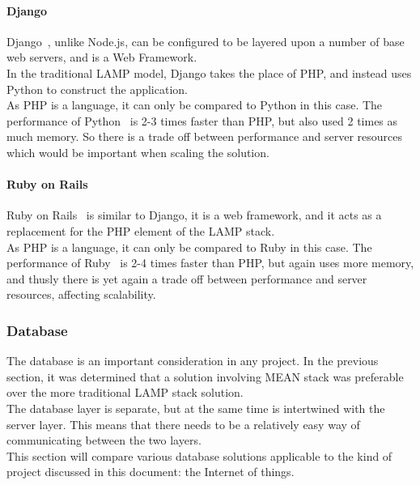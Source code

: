 \documentclass[draft,preprint,12pt,3p]{elsarticle}
\begin{document}
\paragraph{Django}
Django~\cite{django}, unlike Node.js, can be configured to be layered upon a number of base web servers, and is a Web Framework.\\
In the traditional LAMP model, Django takes the place of PHP, and instead uses Python to construct the application.\\
As PHP is a language, it can only be compared to Python in this case. The performance of Python~\cite{djangovsphp} is 2-3 times faster than PHP, but also used 2 times as much memory. So there is a trade off between performance and server resources which would be important when scaling the solution.

\paragraph{Ruby on Rails}
Ruby on Rails~\cite{ruby} is similar to Django, it is a web framework, and it acts as a replacement for the PHP element of the LAMP stack.\\
As PHP is a language, it can only be compared to Ruby in this case. The performance of Ruby~\cite{rubyvsphp} is 2-4 times faster than PHP, but again uses more memory, and thusly there is yet again a trade off between performance and server resources, affecting scalability.


\subsubsection{Database}
The database is an important consideration in any project. In the previous section, it was determined that a solution involving MEAN stack was preferable over the more traditional LAMP stack solution.\\
The database layer is separate, but at the same time is intertwined with the server layer. This means that there needs to be a relatively easy way of communicating between the two layers.\\
This section will compare various database solutions applicable to the kind of project discussed in this document: the Internet of things.\\
\end{document}
